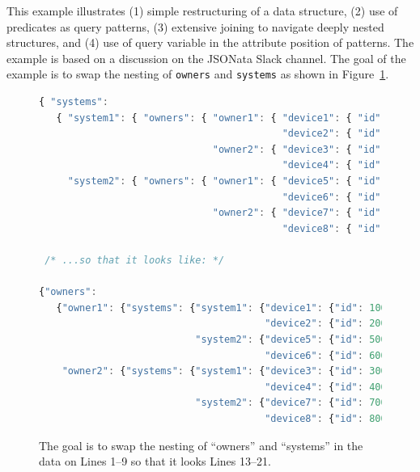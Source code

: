 \documentclass[10pt,letterpaper]{article} %
\newcommand{\stt}[1]{\texttt{#1}} %
\begin{document}
This example illustrates (1) simple restructuring of a data structure, (2) use of predicates as query patterns, (3) extensive joining
to navigate deeply nested structures, and (4) use of query variable in the attribute position of patterns.
The example is based on a discussion on the JSONata Slack channel.
The goal of the example is to swap the nesting of \stt{owners} and \stt{systems} as shown in Figure~\ref{data:restruct}.

\begin{figure}[H]
  \caption{The goal is to swap the nesting of ``owners'' and ``systems'' in the data on Lines 1--9  so that it looks Lines 13--21.}
 \label{data:restruct}
\begin{lstlisting}[language=JavaScript,basicstyle=\ttfamily\scriptsize,numberstyle=\scriptsize]
{ "systems":
   { "system1": { "owners": { "owner1": { "device1": { "id": 100, "status": "Ok" },
                                          "device2": { "id": 200, "status": "Ok" }},
                              "owner2": { "device3": { "id": 300, "status": "Ok" },
                                          "device4": { "id": 400, "status": "Ok" }}}},
     "system2": { "owners": { "owner1": { "device5": { "id": 500, "status": "Ok" },
                                          "device6": { "id": 600, "status": "Ok" }},
                              "owner2": { "device7": { "id": 700, "status": "Ok" },
                                          "device8": { "id": 800, "status": "Ok" }}}}}}

 /* ...so that it looks like: */

{"owners":
   {"owner1": {"systems": {"system1": {"device1": {"id": 100, "status": "Ok"},
                                       "device2": {"id": 200, "status": "Ok"}},
                           "system2": {"device5": {"id": 500, "status": "Ok"},
                                       "device6": {"id": 600, "status": "Ok"}}},
    "owner2": {"systems": {"system1": {"device3": {"id": 300, "status": "Ok"},
                                       "device4": {"id": 400, "status": "Ok"}},
                           "system2": {"device7": {"id": 700, "status": "Ok"},
                                       "device8": {"id": 800, "status": "Ok"}}}}}))))
\end{lstlisting}
\end{figure} \vspace{-3em}
\end{document}
